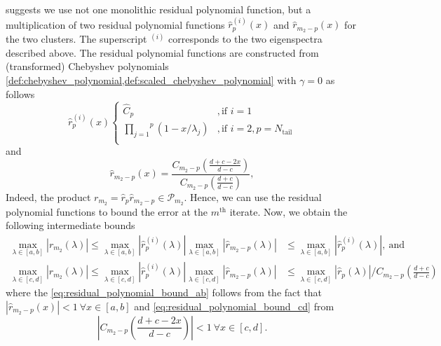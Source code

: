 \citeauthor{cg_sharpened_convrate_Axelsson1976} suggests we use not one monolithic residual polynomial function, but a multiplication of two residual polynomial functions $\hat{r}^{(i)}_p(x)$ and $\hat{r}_{m_2-p}(x)$ for the two clusters. The superscript $^{(i)}$ corresponds to the two eigenspectra described above. The residual polynomial functions are constructed from (transformed) Chebyshev polynomials \cref{def:chebyshev_polynomial,def:scaled_chebyshev_polynomial} with $\gamma = 0$ as follows
\begin{equation}
    \hat{r}^{(i)}_p (x)
    \begin{cases}
        \hat{C}_p                                            & , \text{if } i = 1                      \\
        \overset{p}{\underset{j=1}{\prod}} (1 - x/\lambda_j) & , \text{if } i = 2, p = N_{\text{tail}} \\
    \end{cases}
    \label{eq:residual_polynomial_rm}
\end{equation}
and
\begin{equation}
    \hat{r}_{{m_2}-p} (x) = \frac{C_{m_2-p} \left(\frac{d + c - 2x}{d - c}\right)}{C_{m_2-p}\left(\frac{d + c}{d - c}\right)},
    \label{eq:residual_polynomial_rpm}
\end{equation}
Indeed, the product $r_{m_2} = \hat{r}_p \hat{r}_{m_2-p} \in \mathcal{P}_{m_2}$. Hence, we can use the residual polynomial functions to bound the error at the $m^{\text{th}}$ iterate. Now, we obtain the following intermediate bounds
\begin{subequations}
    \begin{align}
        \max_{\lambda \in [a,b]} |r_{m_2}(\lambda)| \leq \max_{\lambda \in [a,b]} |\hat{r}^{(i)}_p(\lambda)| \max_{\lambda \in [a,b]} |\hat{r}_{m_2-p}(\lambda)| & \leq \max_{\lambda \in [a,b]} |\hat{r}^{(i)}_p(\lambda)|, \ \text{and} \label{eq:residual_polynomial_bound_ab}                     \\
        \max_{\lambda \in [c,d]} |r_{m_2}(\lambda)| \leq \max_{\lambda \in [c,d]} |\hat{r}^{(i)}_p(\lambda)| \max_{\lambda \in [c,d]} |\hat{r}_{m_2-p}(\lambda)| & \leq \max_{\lambda \in [c,d]} |\hat{r}_{p}(\lambda)|/C_{m_2-p}\left(\frac{d+c}{d-c}\right) \label{eq:residual_polynomial_bound_cd}
    \end{align}
\end{subequations}
where the \cref{eq:residual_polynomial_bound_ab} follows from the fact that $|\hat{r}_{m_2-p}(x)| < 1 \ \forall x \in [a,b]$ and \cref{eq:residual_polynomial_bound_cd} from
\[
    \left|C_{m_2-p}\left(\frac{d+c -2x}{d-c}\right)\right| < 1 \ \forall x \in [c,d].
\]

